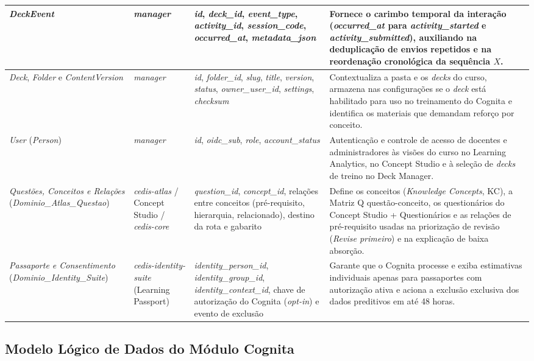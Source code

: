 {\begin{longtable}{>{\raggedright\arraybackslash}p{3.0cm}>{\raggedright\arraybackslash}p{2.4cm}>{\raggedright\arraybackslash}p{3.8cm}>{\raggedright\arraybackslash}p{4.6cm}}
\hline
\textit{DeckEvent} & \textit{manager} & \textit{id}, \textit{deck\_id}, \textit{event\_type}, \textit{activity\_id}, \textit{session\_code}, \textit{occurred\_at}, \textit{metadata\_json} & Fornece o carimbo temporal da interação (\textit{occurred\_at} para \textit{activity\_started} e \textit{activity\_submitted}), auxiliando na deduplicação de envios repetidos e na reordenação cronológica da sequência $X$. \\
\hline
\textit{Deck}, \textit{Folder} e \textit{ContentVersion} & \textit{manager} & \textit{id}, \textit{folder\_id}, \textit{slug}, \textit{title}, \textit{version}, \textit{status}, \textit{owner\_user\_id}, \textit{settings}, \textit{checksum} & Contextualiza a pasta e os \textit{decks} do curso, armazena nas configurações se o \textit{deck} está habilitado para uso no treinamento do Cognita e identifica os materiais que demandam reforço por conceito. \\
\hline
\textit{User} (\textit{Person}) & \textit{manager} & \textit{id}, \textit{oidc\_sub}, \textit{role}, \textit{account\_status} & Autenticação e controle de acesso de docentes e administradores às visões do curso no Learning Analytics, no Concept Studio e à seleção de \textit{decks} de treino no Deck Manager. \\
\hline
\textit{Questões, Conceitos e Relações} (\textit{Dominio\_\allowbreak Atlas\_Questao}) & \textit{cedis-atlas} / Concept Studio / \textit{cedis-core} & \textit{question\_id}, \textit{concept\_id}, relações entre conceitos (pré-requisito, hierarquia, relacionado), destino da rota e gabarito & Define os conceitos (\textit{Knowledge Concepts}, KC), a Matriz Q questão-conceito, os questionários do Concept Studio + Questionários e as relações de pré-requisito usadas na priorização de revisão (\textit{Revise primeiro}) e na explicação de baixa absorção. \\
\hline
\textit{Passaporte e Consentimento} (\textit{Dominio\_\allowbreak Identity\_Suite}) & \textit{cedis-identity-\allowbreak suite} (Learning Passport) & \textit{identity\_person\_id}, \textit{identity\_group\_id}, \textit{identity\_context\_id}, chave de autorização do Cognita (\textit{opt-in}) e evento de exclusão & Garante que o Cognita processe e exiba estimativas individuais apenas para passaportes com autorização ativa e aciona a exclusão exclusiva dos dados preditivos em até 48 horas. \\
\hline
\end{longtable}
}

\subsection{Modelo Lógico de Dados do Módulo Cognita}
\label{subsec:der-cognita}

